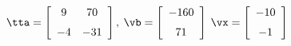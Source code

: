 {$\tta = \left[ \begin {array}{cc} 9&70\\\noalign{\medskip}-4&-31\end {array}
 \right],$
 \quad
$\vb =\left[ \begin {array}{c} -160\\\noalign{\medskip}71\end {array}
 \right]$ 
}
{$\vx = \left[ \begin {array}{c} -10\\\noalign{\medskip}-1\end {array}
 \right]$}
 